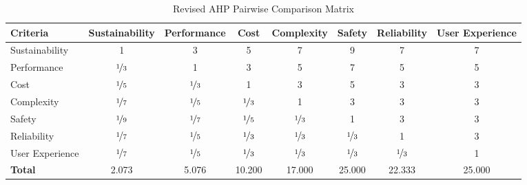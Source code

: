 \documentclass[12pt]{report}
\begin{document}
\begin{landscape}
\begin{table}[h!]
\centering
\caption{Revised AHP Pairwise Comparison Matrix}
\label{tab:revised_ahp_matrix}
\begin{tabular}{l c c c c c c c}
\toprule
\textbf{Criteria} & \textbf{Sustainability} & \textbf{Performance} & \textbf{Cost} & \textbf{Complexity} & \textbf{Safety} & \textbf{Reliability} & \textbf{User Experience} \\
\midrule
Sustainability & 1 & 3 & 5 & 7 & 9 & 7 & 7 \\
Performance & $\nicefrac{1}{3}$ & 1 & 3 & 5 & 7 & 5 & 5 \\
Cost & $\nicefrac{1}{5}$ & $\nicefrac{1}{3}$ & 1 & 3 & 5 & 3 & 3 \\
Complexity & $\nicefrac{1}{7}$ & $\nicefrac{1}{5}$ & $\nicefrac{1}{3}$ & 1 & 3 & 3 & 3 \\
Safety & $\nicefrac{1}{9}$ & $\nicefrac{1}{7}$ & $\nicefrac{1}{5}$ & $\nicefrac{1}{3}$ & 1 & 3 & 3 \\
Reliability & $\nicefrac{1}{7}$ & $\nicefrac{1}{5}$ & $\nicefrac{1}{3}$ & $\nicefrac{1}{3}$ & $\nicefrac{1}{3}$ & 1 & 3 \\
User Experience & $\nicefrac{1}{7}$ & $\nicefrac{1}{5}$ & $\nicefrac{1}{3}$ & $\nicefrac{1}{3}$ & $\nicefrac{1}{3}$ & $\nicefrac{1}{3}$ & 1 \\
\midrule
\textbf{Total} & 2.073 & 5.076 & 10.200 & 17.000 & 25.000 & 22.333 & 25.000 \\
\bottomrule
\end{tabular}
\end{table}


\end{landscape}
\end{document}
